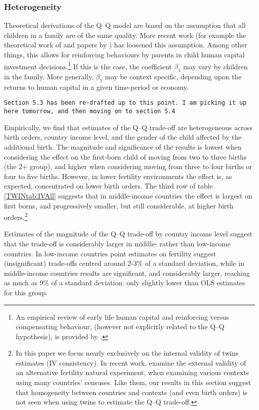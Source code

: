 \documentclass[subeqn]{article}
\begin{document}
\begin{spacing}{1.4}
\subsubsection{Heterogeneity}
Theoretical derivations of the Q--Q model are based on the assumption that all
children in a family are of the same quality. More recent work (for example the 
theoretical work of \citet{AizerCunha2012} and papers by \citet{Brinchetal2016,
  MogstadWiswall2016}) has loosened this assumption. Among 
other things, this allows for reinforcing behaviours by parents in child human 
capital investment decisions.\footnote{An empirical review of early life human 
capital and reinforcing versus compensating behaviour, (however not explicitly 
related to the Q--Q hypothesis), is provided by \citet{AlmondMazumder2013}.} If 
this is the case, the coefficient $\beta_1$ may vary by children in the family. 
More generally, $\beta_1$ may be context specific, depending upon the returns to 
human capital in a given time-period or economy.

\texttt{Section 5.3 has been re-drafted up to this point. I am picking it up
here tomorrow, and then moving on to section 5.4}

Empirically, we find that estimates of the Q--Q trade-off are heterogeneous 
across birth orders, country income level, and the gender of the child affected 
by the additional birth. The magnitude and significance of the results is lowest 
when considering the effect on the first-born child of moving from two to three 
births (the 2+ group), and higher when considering moving from three to four 
births or four to five births. However, in lower fertility environments the 
effect is, as expected, concentrated on lower birth orders. The third row of 
table \ref{TWINtab:IVAll} suggests that in middle-income countries the effect is 
largest on first borns, and progressively smaller, but still considerable, at 
higher birth orders.\footnote{In this paper we focus nearly exclusively on
the internal validity of twins estimates (IV consistency).  In recent work,
\citet{Deheijaetal2015} examine the external validity of an alternative 
fertility natural experiment, when examining various contexts using many
countries' censuses.  Like them, our results in this section suggest that
homogeneity between countries and contexts (and even birth orders) is not
seen when using twins to estimate the Q--Q trade-off.}

Estimates of the magnitude of the Q--Q trade-off by country income level suggest 
that the trade-off is considerably larger in middle- rather than low-income 
countries. In low-income countries point estimates on fertility suggest 
(insignificant) trade-offs centred around 2-3\% of a standard deviation, while 
in middle-income countries results are significant, and considerably larger,
reaching as much as 9\% of a standard deviation: only slightly lower than OLS 
estimates for this group.


\end{spacing}
\end{document}
